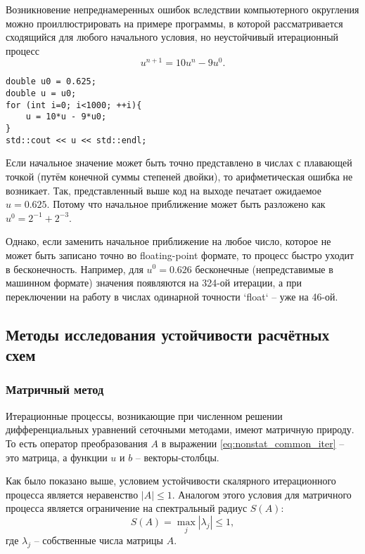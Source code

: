 Возникновение непреднамеренных ошибок вследствии компьютерного округления можно проиллюстрировать на примере
программы, в которой рассматривается сходящийся для любого начального условия, но неустойчивый итерационный процесс
\begin{equation*}
    u^{n+1} = 10 u^{n} - 9 u^{0}.
\end{equation*}

\begin{verbatim}
double u0 = 0.625;
double u = u0;
for (int i=0; i<1000; ++i){
    u = 10*u - 9*u0;
}
std::cout << u << std::endl;
\end{verbatim}

Если начальное значение может быть точно представлено в
числах с плавающей точкой (путём конечной суммы степеней двойки),
то арифметическая ошибка не возникает.
Так, представленный выше код на выходе печатает ожидаемое $u=0.625$.
Потому что начальное приближение может быть разложено как $u^0 = 2^{-1} + 2^{-3}$.

Однако, если заменить начальное приближение на любое число,
которое не может быть записано точно во floating-point формате,
то процесс быстро уходит в бесконечность.
Например, для $u^0 = 0.626$ бесконечные (непредставимые в машинном формате) значения
появляются на 324-ой итерации,
а при переключении на работу в числах одинарной точности `float` -- уже на 46-ой.

\subsection{Методы исследования устойчивости расчётных схем}

\subsubsection{Матричный метод}

Итерационные процессы, возникающие при численном решении
дифференциальных уравнений сеточными методами, имеют матричную природу.
То есть оператор преобразования $A$ в выражении \eqref{eq:nonstat_common_iter} -- это матрица,
а функции $u$ и $b$ -- векторы-столбцы.

Как было показано выше, условием устойчивости скалярного итерационного процесса является неравенство $|A| \leq 1$.
Аналогом этого условия для матричного процесса является ограничение на спектральный радиус $S(A)$:
\begin{equation}
    \label{eq:nonstat_spectral_radius}
    S(A) = \max_j{ | \lambda_j | } \leq 1,
\end{equation}
где $\lambda_j$ -- собственные числа матрицы $A$.


